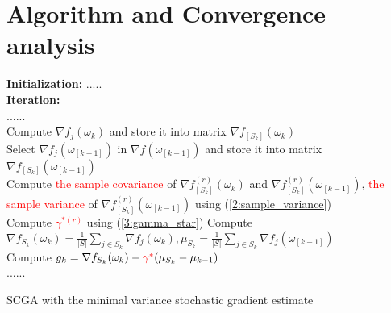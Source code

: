 \documentclass{beamer}
\begin{document}
\section{Algorithm and Convergence analysis}
\begin{frame}
\begin{algorithm}[H]
	\DontPrintSemicolon
	\textbf{Initialization:} .....\\
	\textbf{Iteration:}\\
	{
		......\\
		{
			Compute $\nabla f_{j}(\omega_k)$ and store it into matrix $\nabla f_{[S_k]}(\omega_k) $\\
			Select $\nabla f_{j}(\omega_{[k-1]})$ in $\nabla f(\omega_{[k-1]})$ and store it into matrix $\nabla f_{[S_k]}(\omega_{[k-1]})$\\
		}
		{
			Compute \textcolor{red}{the sample covariance} of $\nabla f_{[S_k]}^{(r)}(\omega_k)$ and $\nabla f_{[S_k]}^{(r)}(\omega_{[k-1]})$, \textcolor{red}{the sample variance} of $\nabla f_{[S_k]}^{(r)}(\omega_{[k-1]})$ using  (\ref{2:sample_variance})\\
			Compute \textcolor{red}{$\gamma^{*(r)}$} using (\ref{3:gamma_star})
		}
		Compute $\nabla f_{S_k}(\omega_k)=\frac{1}{|S|}  \sum_{j\in S_k}\nabla f_{j}(\omega_k),\mu_{S_k}=\frac{1}{|S|} \sum_{j\in S_k}\nabla f_{j}(\omega_{[k-1]})$ \\			
		Compute $g_k =\nabla f_{S_k}(\omega_k)-\textcolor{red}{\gamma^*} (\mu_{S_k}- \mu_{k-1})$\\
		......\\
	}
	\caption{SCGA with the minimal variance stochastic gradient estimate}
\end{algorithm}
\end{frame}
\end{document}
